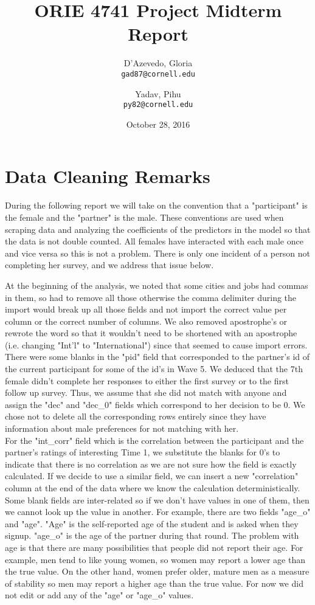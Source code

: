 \documentclass{article}
\title{ORIE 4741 Project Midterm Report}
\author{
  D'Azevedo, Gloria\\
  \texttt{gad87@cornell.edu}
  \and
  Yadav, Pihu\\
  \texttt{py82@cornell.edu}
}
\date{October 28, 2016}
\begin{document}
\maketitle

\section{Data Cleaning Remarks}
During the following report we will take on the convention that a "participant" is the female and the "partner" is the male.  These conventions are used when scraping data and analyzing the coefficients of the predictors in the model so that the data is not double counted.  All females have interacted with each male once and vice versa so this is not a problem.  There is only one incident of a person not completing her survey, and we address that issue below.

At the beginning of the analysis, we noted that some cities and jobs had commas in them, so had to remove all those otherwise the comma delimiter during the import would break up all those fields and not import the correct value per column or the correct number of columns.  We also removed apostrophe's  or rewrote the word so that it wouldn't need to be shortened with an apostrophe (i.e. changing "Int'l" to "International") since that seemed to cause import errors.\\

There were some blanks in the "pid" field that corresponded to the partner's id of the current participant for some of the id's in Wave 5. We deduced that the 7th female  didn't complete her responses to either the first survey or to the first follow up survey. Thus, we assume that she did not match with anyone and assign the "dec" and "dec\_0" fields which correspond to her decision to be 0. We chose not to delete all the corresponding rows entirely since they have information about male preferences for not matching with her.\\

For the "int\_corr" field which is the correlation between the participant and the partner's ratings of interesting Time 1, we substitute the blanks for 0's to indicate that there is no correlation as we are not sure how the field is exactly calculated. If we decide to use a similar field, we can insert a new "correlation" column at the end of the data where we know the calculation deterministically.\\

Some blank fields are inter-related so if we don't have values in one of them, then we cannot look up the value in another. For example, there are two fields "age\_o" and "age". "Age" is the self-reported age of the student and is asked when they signup. "age\_o" is the age of the partner during that round. The problem with age is that there are many possibilities that people did not report their age.  For example, men tend to like young women, so women may report a lower age than the true value.  On the other hand, women prefer older, mature men as a measure of stability so men may report a higher age than the true value.  For now we did not edit or add any of the "age" or "age\_o" values.\\
\end{document}
